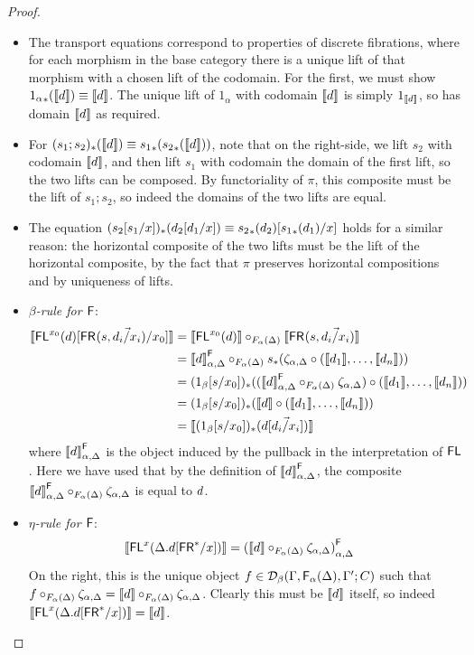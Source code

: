 \begin{proof}
\begin{itemize}
\item The transport equations correspond to properties of discrete fibrations, where for each morphism in the base category there is a unique lift of that morphism with a chosen lift of the codomain. For the first, we must show ${1_\alpha}_*(\llbracket d \rrbracket) \equiv \llbracket d \rrbracket$. The unique lift of $1_\alpha$ with codomain $\llbracket d \rrbracket$ is simply $1_{\llbracket d\rrbracket}$, so has domain $\llbracket d\rrbracket$ as required.
\item For $(s_1;s_2)_*(\llbracket d \rrbracket) \equiv {s_1}_*({s_2}_*(\llbracket d\rrbracket))$, note that on the right-side, we lift $s_2$ with codomain $\llbracket d \rrbracket$, and then lift $s_1$ with codomain the domain of the first lift, so the two lifts can be composed. By functoriality of $\pi$, this composite must be the lift of $s_1;s_2$, so indeed the domains of the two lifts are equal.
\item The equation $(s_2[s_1/x])_*(d_2[d_1/x]) \equiv {s_2}_*(d_2)[{s_1}_*(d_1)/x]$ holds for a similar reason: the horizontal composite of the two lifts must be the lift of the horizontal composite, by the fact that $\pi$ preserves horizontal compositions and by uniqueness of lifts.

\item \emph{$\beta$-rule for $\mathsf{F}$}:
\begin{align*}
\llbracket \mathsf{FL}^{x_0}(d)[\mathsf{FR}_{}(s,\vec{d_i/x_i})/x_0] \rrbracket &= \llbracket \mathsf{FL}^{x_0}(d)\rrbracket \circ_{F_\alpha(\Delta)} \llbracket \mathsf{FR}_{}(s,\vec{d_i/x_i})\rrbracket \\
&={\llbracket d \rrbracket}^{\mathsf{F}}_{{\alpha},{\Delta}} \circ_{F_\alpha(\Delta)} s_*(\zeta_{\alpha, \Delta} \circ (\llbracket d_1 \rrbracket, \dots, \llbracket d_n \rrbracket)) \\
&= (1_\beta[s/x_0])_*(({\llbracket d \rrbracket}^{\mathsf{F}}_{{\alpha},{\Delta}} \circ_{F_\alpha(\Delta)} \zeta_{\alpha, \Delta}) \circ (\llbracket d_1 \rrbracket, \dots, \llbracket d_n \rrbracket)) \\
&= (1_\beta[s/x_0])_*(\llbracket d \rrbracket \circ (\llbracket d_1 \rrbracket, \dots, \llbracket d_n \rrbracket)) \\
&= \llbracket (1_\beta[s/x_0])_*(d[\vec{d_i/x_i}]) \rrbracket
\end{align*}
where ${\llbracket d \rrbracket}^{\mathsf{F}}_{{\alpha},{\Delta}}$ is the object induced by the pullback in the interpretation of $\mathsf{FL}$. Here we have used that by the definition of ${\llbracket d \rrbracket}^{\mathsf{F}}_{{\alpha},{\Delta}}$, the composite ${\llbracket d \rrbracket}^{\mathsf{F}}_{{\alpha},{\Delta}} \circ_{F_\alpha(\Delta)} \zeta_{\alpha, \Delta}$ is equal to $d$.

\item \emph{$\eta$-rule for $\mathsf{F}$}:
\begin{align*}
\llbracket \mathsf{FL}^{x}(\Delta.d[\mathsf{FR}^*/x]) \rrbracket &= {(\llbracket d \rrbracket \circ_{F_\alpha(\Delta)} \zeta_{\alpha, \Delta})}^{\mathsf{F}}_{{\alpha},{\Delta}}
\end{align*} 
On the right, this is the unique object $f \in \mathcal{D}_\beta(\Gamma,\mathsf{F}_{\alpha}(\Delta),\Gamma';C)$ such that $f \circ_{F_\alpha(\Delta)} \zeta_{\alpha, \Delta} = \llbracket d \rrbracket \circ_{F_\alpha(\Delta)} \zeta_{\alpha, \Delta}$. Clearly this must be $\llbracket d \rrbracket$ itself, so indeed $\llbracket \mathsf{FL}^{x}(\Delta.d[\mathsf{FR}^*/x]) \rrbracket = \llbracket d \rrbracket$.


\end{itemize}
\end{proof}

